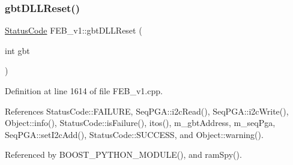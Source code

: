\subsubsection{\texorpdfstring{gbt\+D\+L\+L\+Reset()}{gbtDLLReset()}}
{\footnotesize\ttfamily \hyperlink{classStatusCode}{Status\+Code} F\+E\+B\+\_\+v1\+::gbt\+D\+L\+L\+Reset (\begin{DoxyParamCaption}\item[{int}]{gbt }\end{DoxyParamCaption})}



Definition at line 1614 of file F\+E\+B\+\_\+v1.\+cpp.



References Status\+Code\+::\+F\+A\+I\+L\+U\+RE, Seq\+P\+G\+A\+::i2c\+Read(), Seq\+P\+G\+A\+::i2c\+Write(), Object\+::info(), Status\+Code\+::is\+Failure(), itos(), m\+\_\+gbt\+Address, m\+\_\+seq\+Pga, Seq\+P\+G\+A\+::set\+I2c\+Add(), Status\+Code\+::\+S\+U\+C\+C\+E\+SS, and Object\+::warning().



Referenced by B\+O\+O\+S\+T\+\_\+\+P\+Y\+T\+H\+O\+N\+\_\+\+M\+O\+D\+U\+L\+E(), and ram\+Spy().


